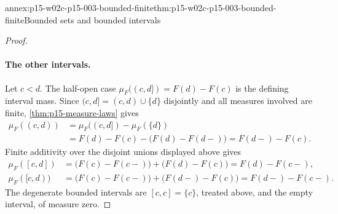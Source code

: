 \begin{annexitem}{annex:p15-w02c-p15-003-bounded-finite}{thm:p15-w02c-p15-003-bounded-finite}{Bounded sets and bounded intervals}
\begin{proof}
\paragraph{The other intervals.}
Let \(c<d\). The half-open case \(\mu_F((c,d])=F(d)-F(c)\) is the
defining interval mass. Since \((c,d]=(c,d)\cup\{d\}\) disjointly and all
measures involved are finite, \cref{thm:p15-measure-laws} gives
\[
 \begin{aligned}
 \mu_F((c,d))&=\mu_F((c,d])-\mu_F(\{d\})\\
   &=F(d)-F(c)-\bigl(F(d)-F(d-)\bigr)=F(d-)-F(c).
 \end{aligned}
\]
Finite additivity over the disjoint unions displayed above gives
\[
 \begin{aligned}
 \mu_F([c,d])&=\bigl(F(c)-F(c-)\bigr)+\bigl(F(d)-F(c)\bigr)=F(d)-F(c-),\\
 \mu_F([c,d))&=\bigl(F(c)-F(c-)\bigr)+\bigl(F(d-)-F(c)\bigr)=F(d-)-F(c-).
 \end{aligned}
\]
The degenerate bounded intervals are \([c,c]=\{c\}\), treated above, and
the empty interval, of measure zero.
\end{proof}
\end{annexitem}

